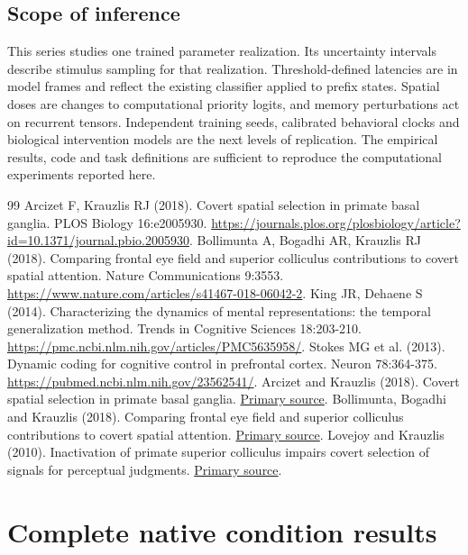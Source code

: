 \documentclass[11pt]{article}
\begin{document}
\subsection{Scope of inference}
This series studies one trained parameter realization. Its uncertainty intervals describe stimulus sampling for that realization. Threshold-defined latencies are in model frames and reflect the existing classifier applied to prefix states. Spatial doses are changes to computational priority logits, and memory perturbations act on recurrent tensors. Independent training seeds, calibrated behavioral clocks and biological intervention models are the next levels of replication. The empirical results, code and task definitions are sufficient to reproduce the computational experiments reported here.

\begin{thebibliography}{99}
 Arcizet F, Krauzlis RJ (2018). Covert spatial selection in primate basal ganglia. PLOS Biology 16:e2005930. \url{https://journals.plos.org/plosbiology/article?id=10.1371/journal.pbio.2005930}.
 Bollimunta A, Bogadhi AR, Krauzlis RJ (2018). Comparing frontal eye field and superior colliculus contributions to covert spatial attention. Nature Communications 9:3553. \url{https://www.nature.com/articles/s41467-018-06042-2}.
 King JR, Dehaene S (2014). Characterizing the dynamics of mental representations: the temporal generalization method. Trends in Cognitive Sciences 18:203-210. \url{https://pmc.ncbi.nlm.nih.gov/articles/PMC5635958/}.
 Stokes MG et al. (2013). Dynamic coding for cognitive control in prefrontal cortex. Neuron 78:364-375. \url{https://pubmed.ncbi.nlm.nih.gov/23562541/}.
 Arcizet and Krauzlis (2018). Covert spatial selection in primate basal ganglia. \href{https://journals.plos.org/plosbiology/article?id=10.1371/journal.pbio.2005930}{Primary source}.
 Bollimunta, Bogadhi and Krauzlis (2018). Comparing frontal eye field and superior colliculus contributions to covert spatial attention. \href{https://pmc.ncbi.nlm.nih.gov/articles/PMC6120922/}{Primary source}.
 Lovejoy and Krauzlis (2010). Inactivation of primate superior colliculus impairs covert selection of signals for perceptual judgments. \href{https://pubmed.ncbi.nlm.nih.gov/20023651/}{Primary source}.
\end{thebibliography}\clearpage\appendix\section{Complete native condition results}
\end{document}
